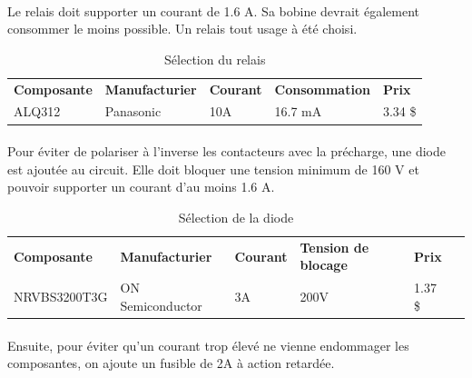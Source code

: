 		\paragraph*{}		
		Le relais doit supporter un courant de 1.6 A. Sa bobine devrait également consommer le moins possible. Un relais tout usage à été choisi.
		
		\begin{table}[H]
			\centering
			\caption{Sélection du relais}
			\label{RelaisPrecharge}
			\renewcommand{\arraystretch}{1.3}
			\begin{tabular}{|p{3cm}|p{3cm}|p{3cm}|p{3cm}|p{3cm}|}
				\hline
				\textbf{Composante} & \textbf{Manufacturier} &  \textbf{Courant} & \textbf{Consommation} & \textbf{Prix}
				\\ \hhline{|=|=|=|=|=|}
				ALQ312 & Panasonic & 10A & 16.7 mA & 3.34 \$ \\ \hline		
			\end{tabular}
		\end{table}				
		
	
		\paragraph*{}	
		Pour éviter de polariser à l'inverse les contacteurs avec la précharge, une diode est ajoutée au circuit. Elle doit bloquer une tension minimum de 160 V et pouvoir supporter un courant d'au moins 1.6 A. 
		
		\begin{table}[H]
			\centering
			\caption{Sélection de la diode}
			\label{DiodePrecharge}
			\renewcommand{\arraystretch}{1.3}
			\begin{tabular}{|p{3cm}|p{3.5cm}|p{2cm}|p{3.5cm}|p{3cm}|p{3cm}|}
				\hline
				\textbf{Composante} & \textbf{Manufacturier} & \textbf{Courant} &  \textbf{Tension de blocage} & \textbf{Prix}
				\\ \hhline{|=|=|=|=|=|=|}
				NRVBS3200T3G & ON Semiconductor & 3A & 200V & 1.37 \$ \\ \hline		
			\end{tabular}
		\end{table}				
		
		\paragraph*{}			
		Ensuite, pour éviter qu'un courant trop élevé ne vienne endommager les composantes, on ajoute un fusible de 2A à action retardée. 
		
